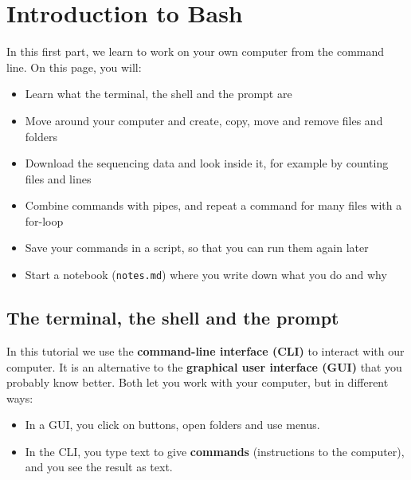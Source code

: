 \documentclass[
  letterpaper,
  DIV=11,
  numbers=noendperiod]{scrreprt}
\author{}
\date{}
\providecommand{\tightlist}{%
  \setlength{\itemsep}{0pt}\setlength{\parskip}{0pt}}
\renewcommand*\contentsname{Table of contents}
\newcommand\contentsname{Table of contents}
\begin{document}

\renewcommand*\contentsname{Table of contents}
{
\hypersetup{linkcolor=}
\setcounter{tocdepth}{2}
\tableofcontents
}

\chapter{Introduction to Bash}\label{introduction-to-bash}

In this first part, we learn to work on your own computer from the
command line. On this page, you will:

\begin{itemize}
\tightlist
\item
  Learn what the terminal, the shell and the prompt are
\item
  Move around your computer and create, copy, move and remove files and
  folders
\item
  Download the sequencing data and look inside it, for example by
  counting files and lines
\item
  Combine commands with pipes, and repeat a command for many files with
  a for-loop
\item
  Save your commands in a script, so that you can run them again later
\item
  Start a notebook (\texttt{notes.md}) where you write down what you do
  and why
\end{itemize}

\section{The terminal, the shell and the
prompt}\label{the-terminal-the-shell-and-the-prompt}

In this tutorial we use the \textbf{command-line interface (CLI)} to
interact with our computer. It is an alternative to the
\textbf{graphical user interface (GUI)} that you probably know better.
Both let you work with your computer, but in different ways:

\begin{itemize}
\tightlist
\item
  In a GUI, you click on buttons, open folders and use menus.
\item
  In the CLI, you type text to give \textbf{commands} (instructions to
  the computer), and you see the result as text.
\end{itemize}
\end{document}
